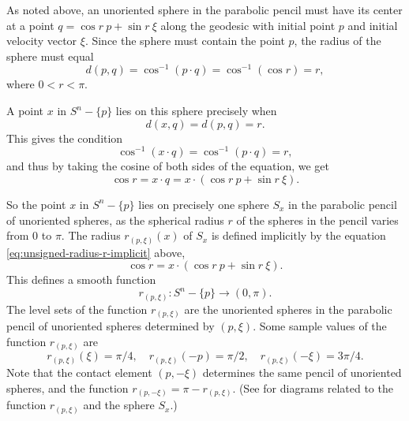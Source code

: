 \documentclass[12pt]{article}
\begin{document}
As noted above, an unoriented sphere in the parabolic pencil must have its center at a point $q = \cos r\  p + \sin r\  \xi$
along the geodesic with initial point $p$ and initial velocity vector $\xi$.  Since the sphere must contain the 
point $p$, the radius of the sphere must equal 
\begin{equation}
\label{eq:unsigned-radius-r}
d(p,q) = \cos^{-1} (p \cdot q) = \cos ^{-1} (\cos r) = r,
\end{equation}
where $0 < r < \pi$.

A point $x$ in $S^n - \{p\}$ lies on this sphere precisely when 
\begin{displaymath}
d(x,q) = d(p,q) = r. 
\end{displaymath} 
This gives the condition
\begin{equation}
\label{eq:unsigned-radius-r-calculation}
\cos^{-1} (x \cdot q) =  \cos^{-1} (p \cdot q) = r,
\end{equation}
 and thus by taking the cosine of both sides of the equation, we get
\begin{equation}
\label{eq:unsigned-radius-r-implicit}
\cos r = x \cdot q = x \cdot (\cos r\  p + \sin r\  \xi).
\end{equation}

So the point $x$ in
$S^n - \{p\}$ lies on precisely one sphere $S_x$ in the parabolic pencil of unoriented spheres, as the spherical radius 
$r$ of the spheres in
the pencil varies from 0 to $\pi$.  The radius $r_{(p,\xi)}(x)$ of $S_x$ is defined implicitly by the equation 
\eqref{eq:unsigned-radius-r-implicit} above,
\begin{equation}
\label{eq:3.6.3}
\cos r = x \cdot (\cos r\  p + \sin r\  \xi).
\end{equation}
This defines a smooth function 
\begin{displaymath}
r_{(p,\xi)}: S^n - \{p\} \rightarrow (0, \pi).
\end{displaymath}
The level sets of the function $r_{(p,\xi)}$  are the unoriented spheres in the parabolic pencil of unoriented spheres
determined by ${(p,\xi)}$.
Some sample values of the function $r_{(p, \xi)}$ are
\begin{displaymath}
r_{(p, \xi)}(\xi) = \pi/4,\quad r_{(p, \xi)}(-p) = \pi/2, \quad r_{(p, \xi)}(-\xi) = 3\pi/4.
\end{displaymath}
Note that the contact element $(p,- \xi)$ determines the same pencil of unoriented spheres, and
the function $r_{(p,- \xi)} = \pi - r_{(p,\xi)}$. (See \cite[pp. 84--88]{Cec1} for diagrams related to the function 
$r_{(p, \xi)}$ and the sphere $S_x$.)
\end{document}
